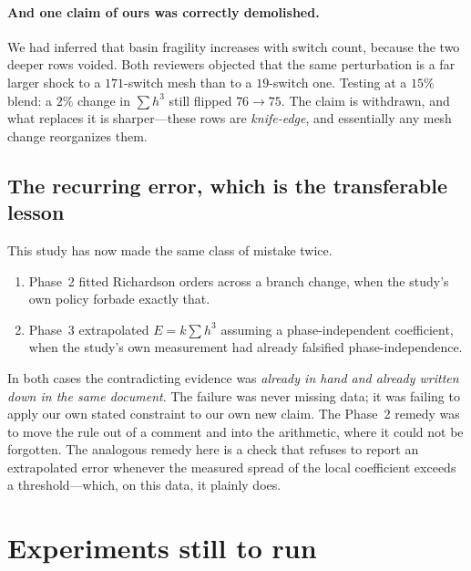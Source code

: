 \documentclass[11pt]{article}
\begin{document}
\paragraph{And one claim of ours was correctly demolished.} We had inferred
that basin fragility increases with switch count, because the two deeper rows
voided. Both reviewers objected that the same perturbation is a far larger
shock to a $171$-switch mesh than to a $19$-switch one. Testing at a $15\%$
blend: a $2\%$ change in $\sum h^3$ still flipped $76\to75$. The claim is
withdrawn, and what replaces it is sharper---these rows are \emph{knife-edge},
and essentially any mesh change reorganizes them.

\subsection{The recurring error, which is the transferable lesson}

This study has now made the same class of mistake twice.

\begin{enumerate}
  \item Phase~2 fitted Richardson orders across a branch change, when the
  study's own policy forbade exactly that.
  \item Phase~3 extrapolated $E = k\sum h^3$ assuming a phase-independent
  coefficient, when the study's own measurement had already falsified
  phase-independence.
\end{enumerate}

In both cases the contradicting evidence was \emph{already in hand and already
written down in the same document}. The failure was never missing data; it was
failing to apply our own stated constraint to our own new claim. The Phase~2
remedy was to move the rule out of a comment and into the arithmetic, where it
could not be forgotten. The analogous remedy here is a check that refuses to
report an extrapolated error whenever the measured spread of the local
coefficient exceeds a threshold---which, on this data, it plainly does.

\section{Experiments still to run}
\label{sec:next}
\end{document}
